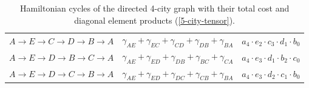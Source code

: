 \documentclass[msc,oneside]{ubcthesis}
\begin{document}
\begin{table}[h]
\begin{tabular}{|c|c|c|}
$A \rightarrow E \rightarrow C \rightarrow D \rightarrow B \rightarrow A$ & $ \gamma_{AE} + \gamma_{EC} + \gamma_{CD} + \gamma_{DB} + \gamma_{BA}$ & $a_4  \cdot e_2 \cdot c_3 \cdot d_1 \cdot b_0$ \\
$A \rightarrow E \rightarrow D \rightarrow B \rightarrow C \rightarrow A$ & $ \gamma_{AE} + \gamma_{ED} + \gamma_{DB} + \gamma_{BC} + \gamma_{CA}$ & $a_4  \cdot e_3 \cdot d_1 \cdot b_2 \cdot c_0$ \\
$A \rightarrow E \rightarrow D \rightarrow C \rightarrow B \rightarrow A$ & $ \gamma_{AE} + \gamma_{ED} + \gamma_{DC} + \gamma_{CB} + \gamma_{BA}$ & $a_4  \cdot e_3 \cdot d_2 \cdot c_1 \cdot b_0$ \\
			\hline
			\end{tabular}
\caption{Hamiltonian cycles of the directed 4-city graph with their total cost and diagonal element products (\ref{5-city-tensor}).}
\label{table:ham-cycle-details-5-city}
\end{table}
\end{document}
